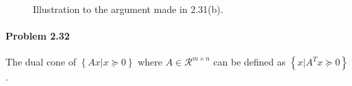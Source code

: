 \documentclass[12pt] {article}
\begin{document}
\begin{figure}[!tbh]
\centering        
   \caption{Illustration to the argument made in 2.31(b).}
   \label{fig:v}
\end{figure}


\paragraph{Problem 2.32} The dual cone of $\left\lbrace Ax | x \succeq 0 \right\rbrace$ where $A \in \mathcal{R}^{m \times n}$ can be defined as $\left\lbrace x | A^{T}x \succeq 0 \right\rbrace$.

\end{document}
